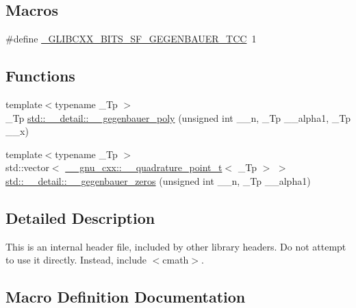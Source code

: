 \subsection*{Macros}
\begin{DoxyCompactItemize}
\item 
\#define \hyperlink{sf__gegenbauer_8tcc_a852487dbb4d1ae46436391df0454ef59}{\+\_\+\+G\+L\+I\+B\+C\+X\+X\+\_\+\+B\+I\+T\+S\+\_\+\+S\+F\+\_\+\+G\+E\+G\+E\+N\+B\+A\+U\+E\+R\+\_\+\+T\+CC}~1
\end{DoxyCompactItemize}
\subsection*{Functions}
\begin{DoxyCompactItemize}
\item 
{\footnotesize template$<$typename \+\_\+\+Tp $>$ }\\\+\_\+\+Tp \hyperlink{namespacestd_1_1____detail_af8641aafc4c639c68963e53d1f6c7083}{std\+::\+\_\+\+\_\+detail\+::\+\_\+\+\_\+gegenbauer\+\_\+poly} (unsigned int \+\_\+\+\_\+n, \+\_\+\+Tp \+\_\+\+\_\+alpha1, \+\_\+\+Tp \+\_\+\+\_\+x)
\item 
{\footnotesize template$<$typename \+\_\+\+Tp $>$ }\\std\+::vector$<$ \hyperlink{struct____gnu__cxx_1_1____quadrature__point__t}{\+\_\+\+\_\+gnu\+\_\+cxx\+::\+\_\+\+\_\+quadrature\+\_\+point\+\_\+t}$<$ \+\_\+\+Tp $>$ $>$ \hyperlink{namespacestd_1_1____detail_adb195fa4e0feab7b1380260e7f56f061}{std\+::\+\_\+\+\_\+detail\+::\+\_\+\+\_\+gegenbauer\+\_\+zeros} (unsigned int \+\_\+\+\_\+n, \+\_\+\+Tp \+\_\+\+\_\+alpha1)
\end{DoxyCompactItemize}


\subsection{Detailed Description}
This is an internal header file, included by other library headers. Do not attempt to use it directly. Instead, include $<$cmath$>$. 

\subsection{Macro Definition Documentation}
\mbox{\label{sf__gegenbauer_8tcc_a852487dbb4d1ae46436391df0454ef59}} 
